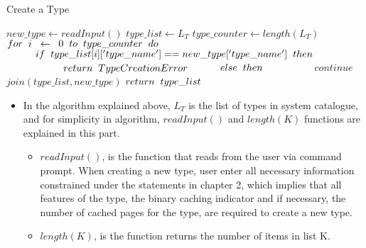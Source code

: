 \documentclass[12pt]{report}
\begin{document}
\begin{algorithm}
\caption{Create a Type}
\begin{algorithmic}[1]
	\STATE $new\_type \leftarrow readInput()$
	\STATE $type\_list \leftarrow L_T$
	\STATE $type\_counter \leftarrow length(L_T)$
	\STATE $for\hspace{0.2cm}i\hspace{0.2cm}\leftarrow\hspace{0.2cm}0\hspace{0.2cm}to\hspace{0.2cm}type\_counter\hspace{0.2cm}do$
	\STATE $\hspace{1cm}if\hspace{0.2cm}type\_list[i]['type\_name']==new\_type['type\_name']\hspace{0.2cm}then$
	\STATE $\hspace{2cm}return\hspace{0.2cm}TypeCreationError$
	\STATE $\hspace{1cm}else\hspace{0.2cm}then$
	\STATE $\hspace{2cm}continue$
	\STATE $join(type\_list, new\_type)$
	\STATE $return\hspace{0.2cm}type\_list$
\end{algorithmic}
\end{algorithm}

\begin{itemize}
\item In the algorithm explained above, $L_T$ is the list of types in system catalogue, and for simplicity in algorithm, $readInput()$ and $length(K)$ functions are explained in this part.

\begin{itemize}
\item $readInput()$, is the function that reads from the user via command prompt. When creating a new type, user enter all necessary information constrained under the statements in chapter 2, which implies that all features of the type, the binary caching indicator and if necessary, the number of cached pages for the type, are required to create a new type.
\item $length(K)$, is the function returns the number of items in list K.
\end{itemize}

\end{itemize}
\end{document}
